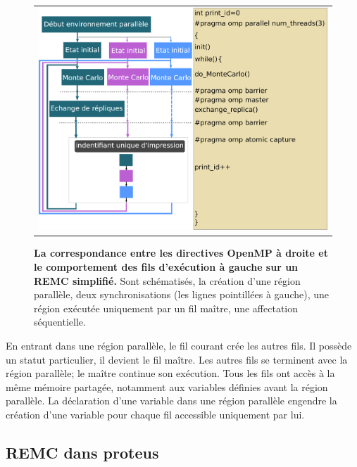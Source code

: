    \begin{figure}[!htbp]
     \centering
     \begin{tabular}{c}
       \includegraphics[width=14cm]{figure/openMP.pdf} 
     \end{tabular}     
     \caption{\textbf{La correspondance entre les directives OpenMP à droite et le comportement des fils d'exécution à gauche sur un REMC simplifié.} Sont schématisés, la création d'une région parallèle, deux synchronisations (les lignes pointillées à gauche), une région exécutée uniquement par un fil maître, une affectation séquentielle. }
\label{fig:openMP}
   \end{figure}

En entrant dans une région parallèle, le fil courant crée les autres fils. Il possède un statut particulier, il devient le fil maître. Les autres fils se terminent avec la région parallèle; le maître continue son exécution. Tous les fils ont accès à la même mémoire partagée, notamment aux variables définies avant la région parallèle. La déclaration d'une variable dans une région parallèle engendre la création d'une variable pour chaque fil accessible uniquement par lui. 
   

\subsection{REMC dans proteus}

